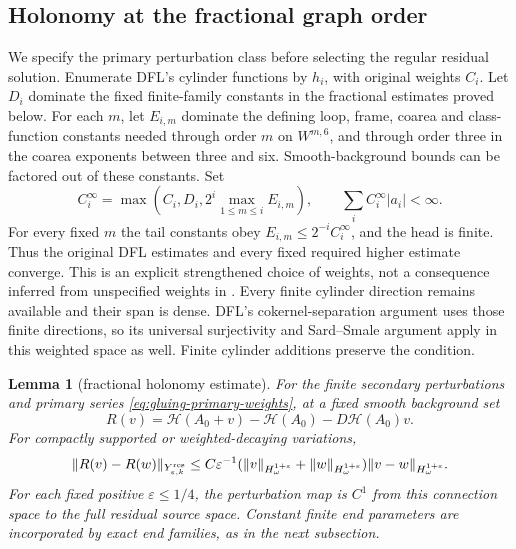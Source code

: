 \documentclass[11pt]{amsart}
\newtheorem{lemma}[theorem]{Lemma}
\theoremstyle{definition}
\theoremstyle{remark}
\theoremstyle{plain}
\begin{document}
\subsection{Holonomy at the fractional graph order}

We specify the primary perturbation class before selecting the regular
residual solution. Enumerate DFL's cylinder functions by $h_i$, with
original weights $C_i$. Let $D_i$ dominate the fixed finite-family
constants in the fractional estimates proved below. For each $m$,
let $E_{i,m}$ dominate the defining loop, frame, coarea and
class-function constants needed through order $m$ on $W^{m,6}$,
and through order three in the coarea exponents between three and
six. Smooth-background bounds can be factored out of these constants.
Set
\begin{equation}\label{eq:gluing-primary-weights}
 C_i^\infty=\max\left(C_i,D_i,
                     2^i\max_{1\leq m\leq i}E_{i,m}\right),
                 \qquad \sum_i C_i^\infty|a_i|<\infty.
\end{equation}
For every fixed $m$ the tail constants obey
$E_{i,m}\leq2^{-i}C_i^\infty$, and the head is finite.
Thus the original DFL estimates and every fixed required higher
estimate converge. This is an explicit strengthened choice of weights,
not a consequence inferred from unspecified weights in
\cite[Proposition~6.1]{DaeFukLip21a}. Every finite cylinder
direction remains available and their span is dense. DFL's
cokernel-separation argument uses those finite directions, so its
universal surjectivity and Sard--Smale argument apply in this weighted
space as well. Finite cylinder additions preserve the condition.

\begin{lemma}[fractional holonomy estimate]\label{lem:gluing-holonomy-estimate}
For the finite secondary perturbations and primary series
\eqref{eq:gluing-primary-weights}, at a fixed smooth background set
\[
 R(v)=\mathcal H(A_0+v)-\mathcal H(A_0)-D\mathcal H(A_0)v.
\]
For compactly supported or weighted-decaying variations,
\begin{equation}\label{eq:gluing-holonomy-remainder}
 \|R(v)-R(w)\|_{Y^{\rm res}_{\varepsilon,k}}
 \leq C\varepsilon^{-1}
       (\|v\|_{H^{1+\varepsilon}_\omega}+\|w\|_{H^{1+\varepsilon}_\omega})
                                      \|v-w\|_{H^{1+\varepsilon}_\omega}.
\end{equation}
For each fixed positive $\varepsilon\leq1/4$, the perturbation
map is $C^1$ from this connection space to the full residual source
space. Constant finite end parameters are incorporated by exact end
families, as in the next subsection.
\end{lemma}
\end{document}
